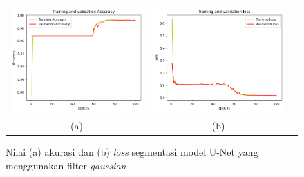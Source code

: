 \begin{enumerate}
	
	\begin{figure}[htbp]
		\centering
		\begin{tabular}{ccc}
			\includegraphics[scale=0.5]{bab4/acc-gaussian-unet.png} & 
			\includegraphics[scale=0.5]{bab4/loss-gaussian-unet.png} & \\
			(a) & (b)    %
		\end{tabular}
		\caption{Nilai (a) akurasi dan (b) \textit{loss} segmentasi model U-Net yang menggunakan filter \textit{gaussian}}
		\label{fig:performance-gaussian-unet}
	\end{figure}
	

\end{enumerate}
